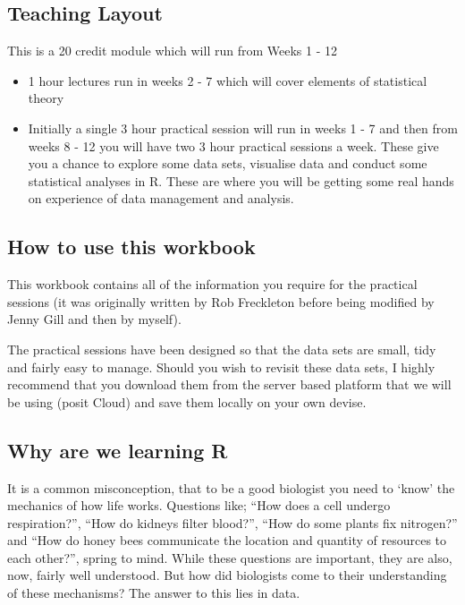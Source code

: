 \documentclass[
]{book}
\providecommand{\tightlist}{%
  \setlength{\itemsep}{0pt}\setlength{\parskip}{0pt}}
\begin{document}
\subsection{Teaching Layout}\label{teaching-layout}

This is a 20 credit module which will run from Weeks 1 - 12

\begin{itemize}
\tightlist
\item
  1 hour lectures run in weeks 2 - 7 which will cover elements of statistical theory
\item
  Initially a single 3 hour practical session will run in weeks 1 - 7 and then from weeks 8 - 12 you will have two 3 hour practical sessions a week. These give you a chance to explore some data sets, visualise data and conduct some statistical analyses in R. These are where you will be getting some real hands on experience of data management and analysis.
\end{itemize}

\subsection{How to use this workbook}\label{how-to-use-this-workbook}

This workbook contains all of the information you require for the practical sessions (it was originally written by Rob Freckleton before being modified by Jenny Gill and then by myself).

The practical sessions have been designed so that the data sets are small, tidy and fairly easy to manage. Should you wish to revisit these data sets, I highly recommend that you download them from the server based platform that we will be using (posit Cloud) and save them locally on your own devise.

\subsection{Why are we learning R}\label{why-are-we-learning-r}

It is a common misconception, that to be a good biologist you need to `know' the mechanics of how life works. Questions like; ``How does a cell undergo respiration?'', ``How do kidneys filter blood?'', ``How do some plants fix nitrogen?'' and ``How do honey bees communicate the location and quantity of resources to each other?'', spring to mind. While these questions are important, they are also, now, fairly well understood. But how did biologists come to their understanding of these mechanisms? The answer to this lies in data.
\end{document}
